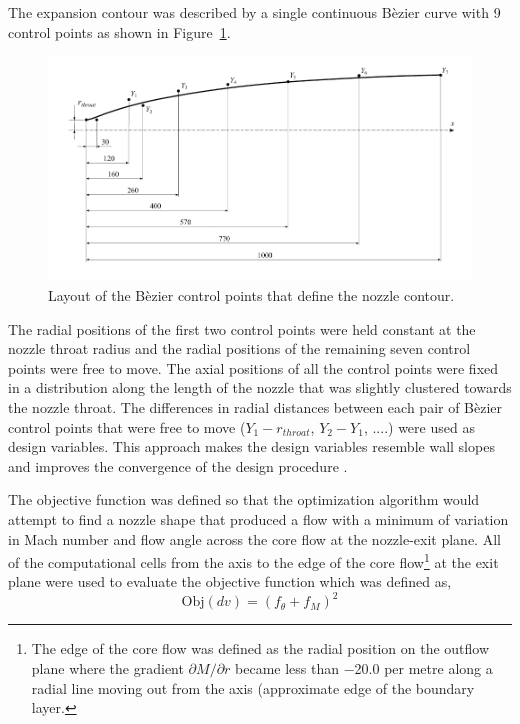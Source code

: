 \documentclass[12pt,a4paper]{article}
\begin{document}
The expansion contour was described by a single continuous B\`ezier curve 
with 9 control points as shown in Figure~\ref{f:initial-contour-with-bezier-pts}.
%
\begin{figure}[htbp]
 \begin{center}
  \includegraphics[width=16cm]{figs/layout-contour-bezier-pts.pdf}
  \caption{Layout of the B\`ezier control points that define the nozzle contour.}
  \label{f:initial-contour-with-bezier-pts}
 \end{center}
\end{figure}
% 
The radial positions of the first two control points were held constant at 
the nozzle throat radius and the radial positions of the remaining seven 
control points were free to move. The axial positions of all the control 
points were fixed in a distribution along the length of the nozzle that was 
slightly clustered towards the nozzle throat. The differences in radial 
distances between each pair of B\`ezier control points that were free to 
move ($Y_1 - r_{throat}$, $Y_2 - Y_1$, ....) were used as design variables. 
This approach makes the design variables resemble wall slopes and improves 
the convergence of the design procedure .

The objective function was defined so that the optimization algorithm 
would attempt to find a nozzle shape that produced a flow with a minimum 
of variation in Mach number and flow angle across the core flow at the 
nozzle-exit plane. All of the computational cells from the axis to the 
edge of the core flow\footnote{The edge of the core flow was defined as 
the radial position on the outflow plane where the gradient 
$\partial M / \partial r$  became less than $-$20.0 per metre along a radial 
line moving out from the axis (approximate edge of the boundary layer.} at the
exit plane were used to evaluate the objective function which was defined as,
%
\begin{equation}
 \label{e:objective-function}
 \mathrm{Obj} \left( dv \right) = \left( f_{\theta} + f_{M} \right)^2
\end{equation}
%
\end{document}
